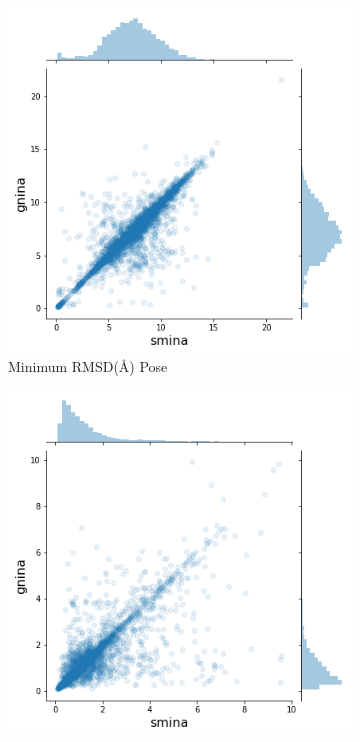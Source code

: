 \documentclass[journal=jcisd8,manuscript=article]{achemso}
\begin{document}
\begin{figure}
    \centering
    \begin{subfigure}[b]{0.48\textwidth}
        \centering
        \includegraphics[width=\textwidth]{figures/other/minpose.png}
        \caption{Minimum RMSD(\AA) Pose}
        \label{fig:SminaCompareMin}
    \end{subfigure}
    \begin{subfigure}[b]{0.48\textwidth}
        \centering
        \includegraphics[width=\textwidth]{figures/other/maxpose.png}

\end{subfigure}
\end{figure}
\end{document}
